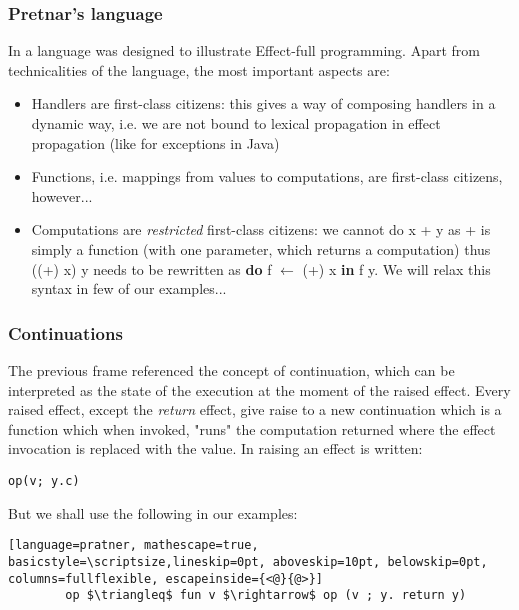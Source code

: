 \documentclass[t]{beamer}
\begin{document}
\begin{frame}
	\frametitle{Pretnar's language}
	
	In \cite{pratner} a language was designed to illustrate Effect-full programming. Apart from technicalities of the language, the most important aspects are:
	\begin{itemize}
		\item Handlers are first-class citizens: this gives a way of \alert{composing handlers} in a dynamic way, i.e. we are not bound to lexical propagation in effect propagation (like for exceptions in Java)
		\item Functions, i.e. mappings from values \alert{to computations}, are first-class citizens, however...
		\item Computations are \textit{restricted} first-class citizens: we cannot do x + y as + is simply a function (with one parameter, which returns a computation) thus ((+) x) y needs to be rewritten as \textbf{do} f $\leftarrow $ (+) x \textbf{in} f y. We will \alert{relax this syntax} in few of our examples...
		
	\end{itemize}
	
	
\end{frame}

\begin{frame}[fragile]
	\frametitle{Continuations}
	The previous frame referenced the concept of continuation, which can be interpreted as \alert{the state of the execution} at the moment of the raised effect.
	\newline
	Every raised effect, except the \textit{return} effect, give raise to a new continuation which is a function which when invoked, "runs" the computation returned where the effect invocation is replaced with the value. 
	\newline
	In \cite{pratner} raising an effect is written: 
	\begin{lstlisting}[basicstyle=\small]
		op(v; y.c)
	\end{lstlisting}		
	But we shall use the following in our examples:
	\begin{lstlisting}[language=pratner, mathescape=true, basicstyle=\scriptsize,lineskip=0pt, aboveskip=10pt, belowskip=0pt, columns=fullflexible, escapeinside={<@}{@>}]
		op $\triangleq$ fun v $\rightarrow$ op (v ; y. return y)
	\end{lstlisting}
\end{frame}
\end{document}

